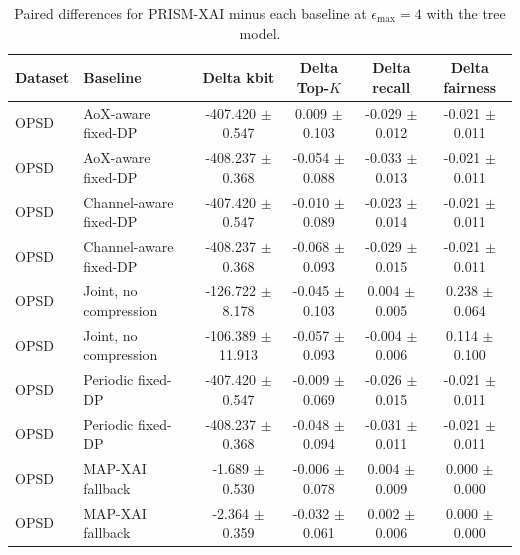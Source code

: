 \begin{table}[t]
\caption{Paired differences for PRISM-XAI minus each baseline at $\epsilon_{\max}=4$ with the tree model.}
\label{tab:paired-differences}
\centering
\scriptsize
\setlength{\tabcolsep}{3pt}
\begin{tabular}{llcccc}
\toprule
Dataset & Baseline & Delta kbit & Delta Top-$K$ & Delta recall & Delta fairness \\
\midrule
OPSD & AoX-aware fixed-DP & -407.420 $\pm$ 0.547 & 0.009 $\pm$ 0.103 & -0.029 $\pm$ 0.012 & -0.021 $\pm$ 0.011 \\
OPSD & AoX-aware fixed-DP & -408.237 $\pm$ 0.368 & -0.054 $\pm$ 0.088 & -0.033 $\pm$ 0.013 & -0.021 $\pm$ 0.011 \\
OPSD & Channel-aware fixed-DP & -407.420 $\pm$ 0.547 & -0.010 $\pm$ 0.089 & -0.023 $\pm$ 0.014 & -0.021 $\pm$ 0.011 \\
OPSD & Channel-aware fixed-DP & -408.237 $\pm$ 0.368 & -0.068 $\pm$ 0.093 & -0.029 $\pm$ 0.015 & -0.021 $\pm$ 0.011 \\
OPSD & Joint, no compression & -126.722 $\pm$ 8.178 & -0.045 $\pm$ 0.103 & 0.004 $\pm$ 0.005 & 0.238 $\pm$ 0.064 \\
OPSD & Joint, no compression & -106.389 $\pm$ 11.913 & -0.057 $\pm$ 0.093 & -0.004 $\pm$ 0.006 & 0.114 $\pm$ 0.100 \\
OPSD & Periodic fixed-DP & -407.420 $\pm$ 0.547 & -0.009 $\pm$ 0.069 & -0.026 $\pm$ 0.015 & -0.021 $\pm$ 0.011 \\
OPSD & Periodic fixed-DP & -408.237 $\pm$ 0.368 & -0.048 $\pm$ 0.094 & -0.031 $\pm$ 0.011 & -0.021 $\pm$ 0.011 \\
OPSD & MAP-XAI fallback & -1.689 $\pm$ 0.530 & -0.006 $\pm$ 0.078 & 0.004 $\pm$ 0.009 & 0.000 $\pm$ 0.000 \\
OPSD & MAP-XAI fallback & -2.364 $\pm$ 0.359 & -0.032 $\pm$ 0.061 & 0.002 $\pm$ 0.006 & 0.000 $\pm$ 0.000 \\
\bottomrule
\end{tabular}
\end{table}
